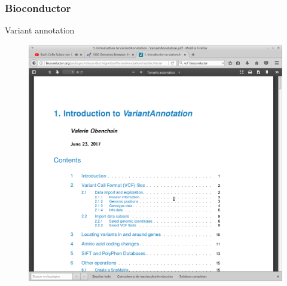 \documentclass{beamer}\usepackage[]{graphicx}\usepackage[]{color}
\begin{document}
\begin{frame}[fragile]
\frametitle{Bioconductor}
Variant annotation
\begin{figure}[htbp]
\begin{center}
\includegraphics[width=.7\linewidth]{vineta.png}
\end{center}
\end{figure}
\end{frame}
\end{document}

